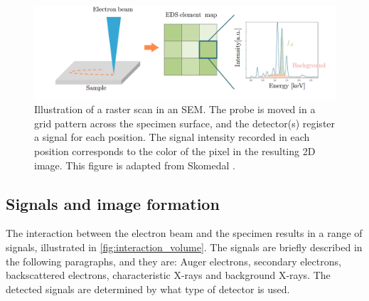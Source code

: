\begin{figure}[ht]
    \centering
    \includegraphics[width=0.8\linewidth]{figures/SEM_raster.png}
    \caption{
        Illustration of a raster scan in an SEM.
        The probe is moved in a grid pattern across the specimen surface, and the detector(s) register a signal for each position.
        The signal intensity recorded in each position corresponds to the color of the pixel in the resulting 2D image.
        This figure is adapted from Skomedal \cite[Fig. 2.14]{skomedal_improving_2022}.
    }
    \label{fig:sem_rasterscan}
\end{figure}






\subsection{Signals and image formation}
\label{theory:sem:sem_signals}

The interaction between the electron beam and the specimen results in a range of signals, illustrated in \cref{fig:interaction_volume}.
The signals are briefly described in the following paragraphs, and they are: Auger electrons, secondary electrons, backscattered electrons, characteristic X-rays and background X-rays.
The detected signals are determined by what type of detector is used.



